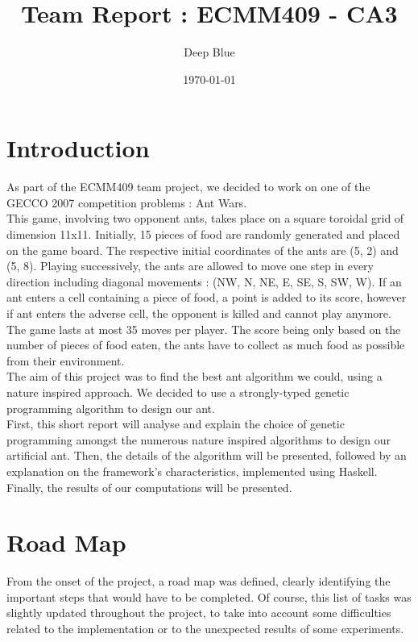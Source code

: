\documentclass[10pt,a4paper]{article}
\begin{document}
\title{Team Report : ECMM409 - CA3}
\author {Deep Blue}
\date{\today}

\maketitle

\tableofcontents
\newpage

\section*{Introduction}

As part of the ECMM409 team project, we decided to work on one of the
GECCO 2007 competition problems : Ant Wars.\\

This game, involving two opponent ants, takes place on a square
toroidal grid of dimension 11x11. Initially, 15 pieces of food are
randomly generated and placed on the game board. The respective
initial coordinates of the ants are (5, 2) and (5, 8). Playing
successively, the ants are allowed to move one step in every direction
including diagonal movements : (NW, N, NE, E, SE, S, SW, W). If an ant
enters a cell containing a piece of food, a point is added to its
score, however if ant enters the adverse cell, the opponent is killed
and cannot play anymore. The game lasts at most 35 moves per
player. The score being only based on the number of pieces of food
eaten, the ants have to collect as much food as possible from their
environment.\\

The aim of this project was to find the best ant algorithm we could,
using a nature inspired approach. We decided to use a strongly-typed
genetic programming algorithm to design our ant.\\

First, this short report will analyse and explain the choice of
genetic programming amongst the numerous nature inspired algorithms to
design our artificial ant. Then, the details of the algorithm will be
presented, followed by an explanation on the framework's
characteristics, implemented using Haskell. Finally, the results of
our computations will be presented.

\section{Road Map}

From the onset of the project, a road map was defined, clearly
identifying the important steps that would have to be completed. Of
course, this list of tasks was slightly updated throughout the
project, to take into account some difficulties related to the
implementation or to the unexpected results of some experiments.
\end{document}

